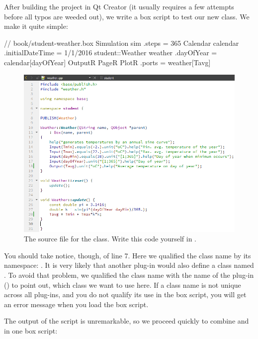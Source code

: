 After building the project in Qt Creator (it usually requires a few attempts before all typos are weeded out), we write a box script to test our new class. We make it quite simple:

\lstset{numbers=left}
\begin{boxscript}
// book/student-weather.box
Simulation sim {
  .steps = 365
  Calendar calendar {
    .initialDateTime = 1/1/2016
  }
  student::Weather weather {
    .dayOfYear = calendar[dayOfYear]
  }
  OutputR {
    PageR {
      PlotR {
        .ports = weather[Tavg]
      }
    }
  }
}
\end{boxscript}
\lstset{numbers=none}

\begin{figure}
\centering
\includegraphics[scale=0.7]{graphics/qt-creator-weather-cpp}
\caption{The source file for the  class. Write this code yourself in .}
\label{fig:qt-creator-weather-cpp}
\end{figure}

You should take notice, though, of line 7. Here we qualified the class name by its namespace: . It is very likely that another plug-in would also define a class named . To avoid that problem, we qualified the class name with the name of the plug-in () to point out, which  class we want to use here. If a class name is not unique across all plug-ins, and you do not qualify its use in the box script, you will get an error message when you load the box script. 

The output of the  script is unremarkable, so we proceed quickly to combine  and  in one box script:

